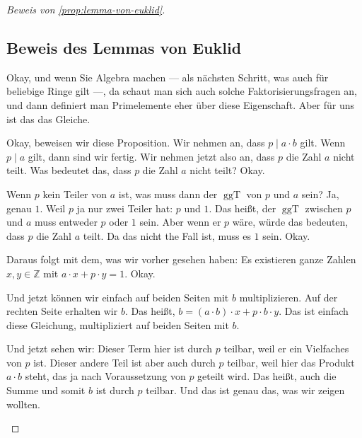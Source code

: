 \begin{proof}[Beweis von \cref{prop:lemma-von-euklid}]

\subsection{Beweis des Lemmas von Euklid}

\begin{spoken-clean}[00:43:14 - 00:46:03]
Okay, und wenn Sie Algebra machen --- als nächsten Schritt, was auch für beliebige Ringe gilt ---, da schaut man sich auch solche Faktorisierungsfragen an, und dann definiert man Primelemente eher über diese Eigenschaft. Aber für uns ist das das Gleiche.

Okay, beweisen wir diese Proposition. Wir nehmen an, dass $p \mid a \cdot b$ gilt. Wenn $p \mid a$ gilt, dann sind wir fertig. Wir nehmen jetzt also an, dass $p$ die Zahl $a$ nicht teilt. Was bedeutet das, dass $p$ die Zahl $a$ nicht teilt? Okay.

Wenn $p$ kein Teiler von $a$ ist, was muss dann der $\operatorname{ggT}$ von $p$ und $a$ sein? Ja, genau $1$. Weil $p$ ja nur zwei Teiler hat: $p$ und $1$. Das heißt, der $\operatorname{ggT}$ zwischen $p$ und $a$ muss entweder $p$ oder $1$ sein. Aber wenn er $p$ wäre, würde das bedeuten, dass $p$ die Zahl $a$ teilt. Da das nicht the Fall ist, muss es $1$ sein. Okay.

Daraus folgt mit dem, was wir vorher gesehen haben: Es existieren ganze Zahlen $x, y \in \mathbb{Z}$ mit $a \cdot x + p \cdot y = 1$. Okay.

Und jetzt können wir einfach auf beiden Seiten mit $b$ multiplizieren. Auf der rechten Seite erhalten wir $b$. Das heißt, $b = (a \cdot b) \cdot x + p \cdot b \cdot y$. Das ist einfach diese Gleichung, multipliziert auf beiden Seiten mit $b$.

Und jetzt sehen wir: Dieser Term hier ist durch $p$ teilbar, weil er ein Vielfaches von $p$ ist. Dieser andere Teil ist aber auch durch $p$ teilbar, weil hier das Produkt $a \cdot b$ steht, das ja nach Voraussetzung von $p$ geteilt wird. Das heißt, auch die Summe und somit $b$ ist durch $p$ teilbar. Und das ist genau das, was wir zeigen wollten.
\end{spoken-clean}

\begin{math-stroke}
\begin{ai-proof-skeleton-invisible-content}
\end{ai-proof-skeleton-invisible-content}


\end{math-stroke}
\end{proof}
